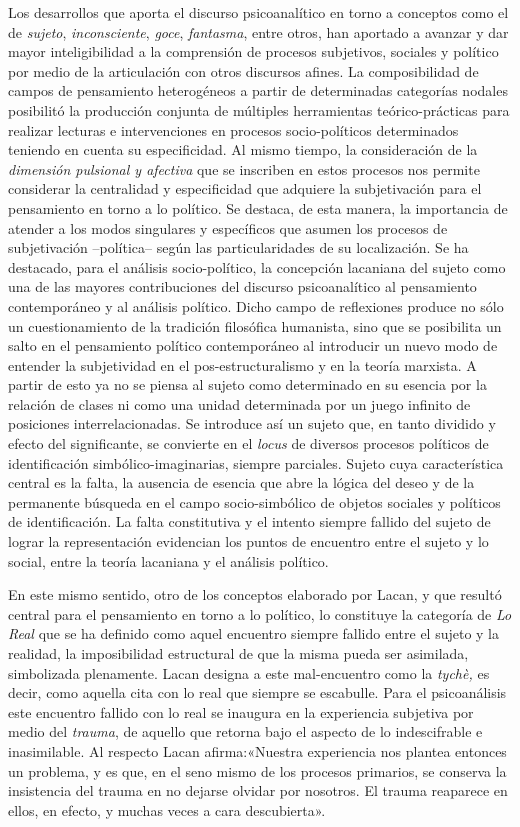 Los desarrollos que aporta el discurso psicoanalítico en torno a conceptos como el de \emph{sujeto}, \emph{inconsciente}, \emph{goce}, \emph{fantasma}, entre otros, han aportado a avanzar y dar mayor inteligibilidad a la comprensión de procesos subjetivos, sociales y político por medio de la articulación con otros discursos afines. La composibilidad de campos de pensamiento heterogéneos a partir de determinadas categorías nodales posibilitó la producción conjunta de múltiples herramientas teórico-prácticas para realizar lecturas e intervenciones en procesos socio-políticos determinados teniendo en cuenta su especificidad. Al mismo tiempo, la consideración de la \emph{dimensión pulsional y afectiva} que se inscriben en estos procesos nos permite considerar la centralidad y especificidad que adquiere la subjetivación para el pensamiento en torno a lo político. Se destaca, de esta manera, la importancia de atender a los modos singulares y específicos que asumen los procesos de subjetivación --política-- según las particularidades de su localización. Se ha destacado, para el análisis socio-político, la concepción lacaniana del sujeto como una de las mayores contribuciones del discurso psicoanalítico al pensamiento contemporáneo y al análisis político. Dicho campo de reflexiones produce no sólo un cuestionamiento de la tradición filosófica humanista, sino que se posibilita un salto en el pensamiento político contemporáneo al introducir un nuevo modo de entender la subjetividad en el pos-estructuralismo y en la teoría marxista. A partir de esto ya no se piensa al sujeto como determinado en su esencia por la relación de clases ni como una unidad determinada por un juego infinito de posiciones interrelacionadas. Se introduce así un sujeto que, en tanto dividido y efecto del significante, se convierte en el \emph{locus} de diversos procesos políticos de identificación simbólico-imaginarias, siempre parciales. Sujeto cuya característica central es la falta, la ausencia de esencia que abre la lógica del deseo y de la permanente búsqueda en el campo socio-simbólico de objetos sociales y políticos de identificación. La falta constitutiva y el intento siempre fallido del sujeto de lograr la representación evidencian los puntos de encuentro entre el sujeto y lo social, entre la teoría lacaniana y el análisis político.

En este mismo sentido, otro de los conceptos elaborado por Lacan, y que resultó central para el pensamiento en torno a lo político, lo constituye la categoría de \emph{Lo Real} que se ha definido como aquel encuentro siempre fallido entre el sujeto y la realidad, la imposibilidad estructural de que la misma pueda ser asimilada, simbolizada plenamente. Lacan designa a este mal-encuentro como la \emph{tychè, }es decir, como aquella cita con lo real que siempre se escabulle. Para el psicoanálisis este encuentro fallido con lo real se inaugura en la experiencia subjetiva por medio del \emph{trauma}, de aquello que retorna bajo el aspecto de lo indescifrable e inasimilable. Al respecto Lacan afirma:«Nuestra experiencia nos plantea entonces un problema, y es que, en el seno mismo de los procesos primarios, se conserva la insistencia del trauma en no dejarse olvidar por nosotros. El trauma reaparece en ellos, en efecto, y muchas veces a cara descubierta».

